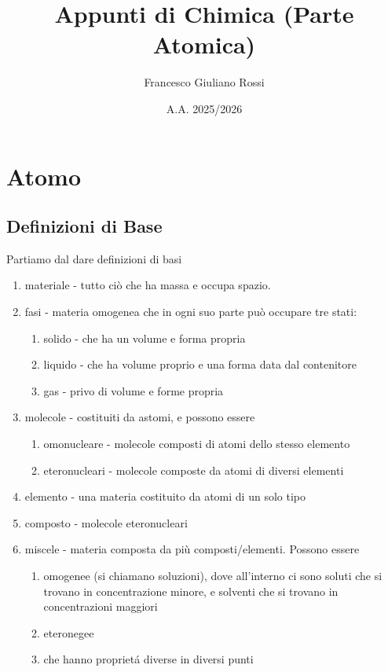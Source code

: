 \documentclass[a4paper]{article}
\title{Appunti di Chimica (Parte Atomica)}
\author{Francesco Giuliano Rossi}
\date{A.A. 2025/2026}
\begin{document}
\maketitle
\tableofcontents
\newpage

\section{Atomo}
\subsection{Definizioni di Base}
Partiamo dal dare definizioni di basi 
\begin{enumerate}
    \item materiale - tutto ciò che ha massa e occupa spazio. 
    \item fasi - materia omogenea che in ogni suo parte può occupare tre stati:
    \begin{enumerate}
        \item solido - che ha un volume e forma propria
        \item liquido - che ha volume proprio e una forma data dal contenitore
        \item gas - privo di volume e forme propria
    \end{enumerate}
    \item molecole - costituiti da astomi, e possono essere 
        \begin{enumerate}
        \item omonucleare - molecole composti di atomi dello stesso elemento
        \item eteronucleari - molecole composte da atomi di diversi elementi
        \end{enumerate}
    \item elemento - una materia costituito da atomi di un solo tipo 
    \item composto - molecole eteronucleari
    \item miscele - materia composta da più composti/elementi. Possono essere
    \begin{enumerate}
        \item omogenee (si chiamano soluzioni), dove all'interno ci sono soluti che si trovano in concentrazione minore, e solventi che si trovano in concentrazioni maggiori
        \item eteronegee
        \item che hanno proprietá diverse in diversi punti
    \end{enumerate}
\end{enumerate}
\end{document}
